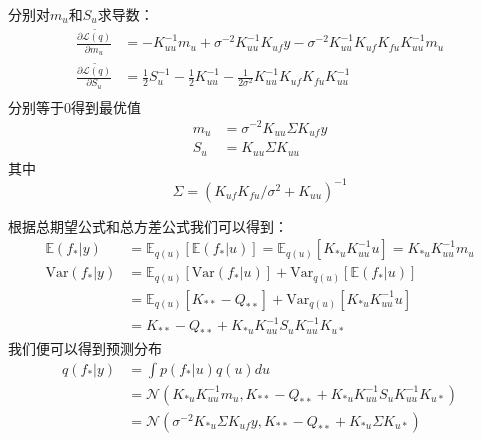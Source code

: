 分别对$m_u$和$S_u$求导数：
\begin{equation}
    \begin{aligned}
        \frac{\partial \tilde{\mathcal L(q)}}{\partial m_u} &= 
        -K_{uu}^{-1} m_u + \sigma^{-2} K_{uu}^{-1} K_{uf} y - \sigma^{-2} 
        K_{uu}^{-1} K_{uf} K_{fu} K_{uu}^{-1} m_u \\
        \frac{\partial \tilde{\mathcal L(q)}}{\partial S_u} &= 
        \frac{1}{2} S_u^{-1} - \frac{1}{2} K_{uu}^{-1} - \frac{1}{2 \sigma^2} 
        K_{uu}^{-1} K_{uf} K_{fu} K_{uu}^{-1} \\
    \end{aligned}
\end{equation}
分别等于0得到最优值
\begin{equation}
    \begin{aligned}
        m_u &= \sigma^{-2} K_{uu} \Sigma K_{uf} y \\
        S_u &= K_{uu} \Sigma K_{uu}
    \end{aligned}
\end{equation}
其中
\begin{equation}
    \Sigma = (K_{uf} K_{fu} / \sigma^2 + K_{uu})^{-1}
\end{equation}

根据总期望公式和总方差公式我们可以得到：
\begin{equation}
    \begin{aligned}
    \mathbb E(f_* | y) &= \mathbb E_{q(u)} [\mathbb E(f_* | u)] = \mathbb E_{q(u)} [K_{*u} K_{uu}^{-1} u] = K_{*u} K_{uu}^{-1} m_u \\
    \text{Var}(f_* | y) &= \mathbb E_{q(u)} [\text{Var}(f_* | u)] + \text{Var}_{q(u)} [\mathbb E(f_* | u)] \\
    &= \mathbb E_{q(u)} [K_{**} - Q_{**}] + \text{Var}_{q(u)} [K_{*u} K_{uu}^{-1} u] \\
    &= K_{**} - Q_{**} + K_{*u} K_{uu}^{-1} S_u K_{uu}^{-1} K_{u*}
\end{aligned}
\end{equation}
我们便可以得到预测分布
\begin{equation} \label{equ:mu_su_predictive}
    \begin{aligned}
        q(f_* | y) &= \int p(f_* | u) q(u) du \\
        &= \mathcal N (K_{*u} K_{uu}^{-1} m_u, K_{**} - Q_{**} + K_{*u} K_{uu}^{-1} S_u K_{uu}^{-1} K_{u*}) \\
        &= \mathcal N (\sigma^{-2} K_{*u} \Sigma K_{uf} y, K_{**} - Q_{**} + K_{*u} \Sigma K_{u*})
    \end{aligned}
\end{equation}

